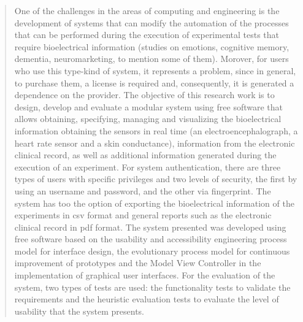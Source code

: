 \begin{abstract}

One of the challenges in the areas of computing and engineering is the development of systems that can modify the automation of the processes that can be performed during the execution of experimental tests that require bioelectrical information (studies on emotions, cognitive memory, dementia, neuromarketing, to mention some of them). Morover, for users who use this type-kind of system, it represents a problem, since in general, to purchase them, a license is required and, consequently, it is generated a dependence on the provider. The objective of this research work is to design, develop and evaluate a modular system using free software that allows obtaining, specifying, managing and visualizing the bioelectrical information obtaining the sensors in real time (an electroencephalograph, a heart rate sensor and a skin conductance), information from the electronic clinical record, as well as additional information generated during the execution of an experiment. For system authentication, there are three types of users with specific privileges and two levels of security, the first by using an username and password, and the other via fingerprint. The system has too the option of exporting the bioelectrical information of the experiments in csv format and general reports such as the electronic clinical record in pdf format. The system presented was developed using free software based on the usability and accessibility engineering process model for interface design, the evolutionary process model for continuous improvement of prototypes and the Model View Controller in the implementation of graphical user interfaces. For the evaluation of the system, two types of tests are used: the functionality tests to validate the requirements and the heuristic evaluation tests to evaluate the level of usability that the system presents. %




\end{abstract}
